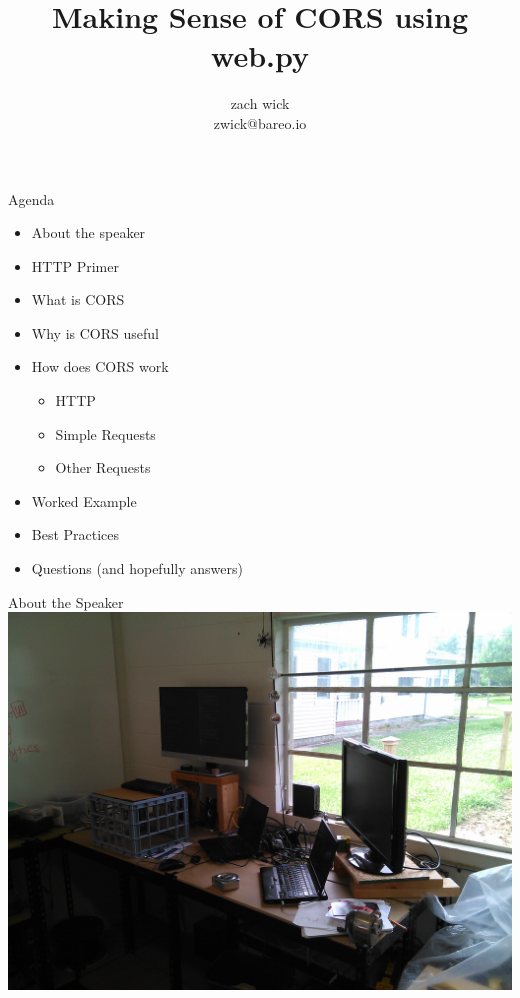\documentclass[11pt]{beamer}
\author{zach wick \\ zwick@bareo.io}
\title{Making Sense of CORS using web.py}
\begin{document}

\begin{frame}
  \titlepage
\end{frame}

\begin{frame}{Agenda}
  \begin{itemize}
  \item About the speaker\\
  \item HTTP Primer\\
  \item What is CORS\\
  \item Why is CORS useful\\
  \item How does CORS work\\
    \begin{itemize}
    \item HTTP\\
    \item Simple Requests\\
    \item Other Requests\\
    \end{itemize}
  \item Worked Example\\
  \item Best Practices\\
  \item Questions (and hopefully answers)
  \end{itemize}
\end{frame}

\begin{frame}{About the Speaker}
 \includegraphics[keepaspectratio=true,width=\framewidth]{shop.jpg}
\end{frame}
\end{document}
